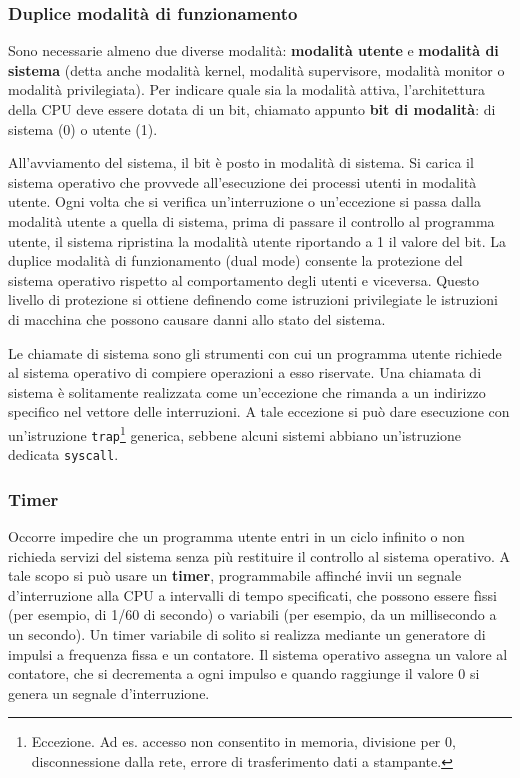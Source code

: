 \documentclass[11pt,a4paper]{article}
\begin{document}
\subsubsection{Duplice modalità di funzionamento}
Sono necessarie almeno due diverse modalità: \textbf{modalità utente} e \textbf{modalità di sistema}
(detta anche modalità kernel, modalità supervisore, modalità monitor o modalità privilegiata).
Per indicare quale sia la modalità attiva, l'architettura della CPU deve essere dotata di un bit,
chiamato appunto \textbf{bit di modalità}: di sistema (0) o utente (1).

All'avviamento del sistema, il bit è posto in modalità di sistema. Si carica il sistema
operativo che provvede all'esecuzione dei processi utenti in modalità utente. Ogni volta che
si verifica un'interruzione o un'eccezione si passa dalla modalità utente a quella di sistema,
prima di passare il controllo al programma uten­te, il sistema ripristina la modalità utente riportando a 1 il valore del bit.
La duplice modalità di funzionamento (dual mode) consente la protezione del sistema operativo rispetto al comportamento degli utenti e viceversa. Questo livello di protezione si ottiene definendo come istruzioni privilegiate le istruzioni di macchina che possono causare danni allo stato del sistema.

Le chiamate di sistema sono gli strumenti con cui un programma utente richiede al si­stema operativo di compiere operazioni a esso riservate. Una chiamata di sistema
è solitamente realizzata come un'eccezione che rimanda a un indirizzo specifico nel vettore
delle interruzioni. A tale eccezione si può dare esecuzione con un'istruzione \texttt{trap}\footnote{Eccezione. Ad es. accesso non consentito in memoria, divisione per 0, disconnessione dalla rete, errore di trasferimento dati a stampante.} generica,
sebbene alcuni sistemi abbiano un'i­struzione dedicata \texttt{syscall}.

\subsubsection{Timer}
Occorre im­pedire che un programma utente entri in un ciclo infinito o non richieda servizi del sistema
senza più restituire il controllo al sistema operativo. A tale scopo si può usare un \textbf{timer},
pro­grammabile affinché invii un segnale d'interruzione alla CPU a intervalli di tempo specificati, che possono essere fìssi (per esempio, di 1/60 di secondo) o variabili (per esempio, da un
millisecondo a un secondo). Un timer variabile di solito si realizza mediante un generatore
di impulsi a frequenza fissa e un contatore. Il sistema operativo assegna un valore al conta­tore, che si decrementa a ogni impulso e quando raggiunge il valore 0 si genera un segnale
d'interruzione.
\end{document}
